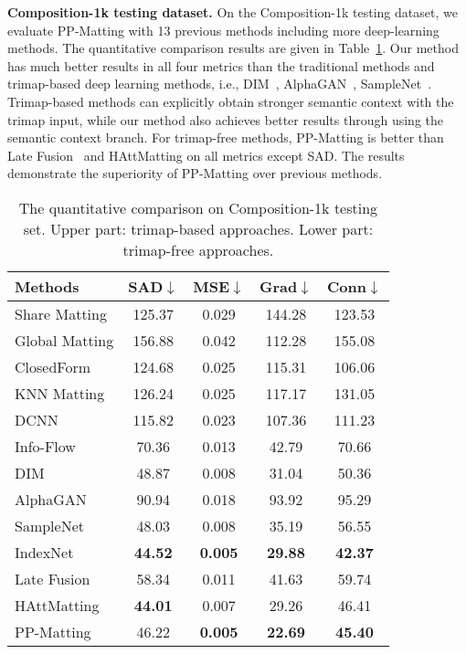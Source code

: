 \documentclass[10pt,twocolumn,letterpaper]{article}
\begin{document}
\textbf{Composition-1k testing dataset.} On the Composition-1k testing dataset, we evaluate PP-Matting with 13 previous methods including more deep-learning methods. The quantitative comparison results are given in Table~\ref{tab:composition}. Our method has much better results in all four metrics than the traditional methods and trimap-based deep learning methods, i.e., DIM~\cite{xu2017deep}, AlphaGAN~\cite{lutz2018alphagan}, SampleNet~\cite{tang2019learning}. Trimap-based methods can explicitly obtain stronger semantic context with the trimap input, while our method also achieves better results through using the semantic context branch. For trimap-free methods, PP-Matting is better than Late Fusion~\cite{zhang2019late} and HAttMatting on all metrics except SAD. The results demonstrate the superiority of PP-Matting over previous methods.

\begin{table}
  \centering
  \begin{tabular}{@{}lcccc@{}}
    \toprule
    Methods & SAD$\downarrow$ & MSE$\downarrow$ & Grad$\downarrow$ & Conn$\downarrow$ \\
    \midrule
    Share Matting \cite{gastal2010shared} & 125.37 & 0.029 & 144.28 & 123.53 \\
    Global Matting\cite{he2011global} & 156.88 & 0.042 & 112.28 & 155.08 \\
    ClosedForm \cite{levin2007closed} & 124.68 & 0.025 & 115.31 & 106.06 \\
    KNN Matting \cite{chen2013knn} & 126.24 & 0.025 & 117.17 & 131.05 \\
    DCNN \cite{shen2016deep} & 115.82 & 0.023 & 107.36 & 111.23 \\
    Info-Flow \cite{aksoy2017designing} & 70.36 & 0.013 & 42.79 & 70.66 \\
    DIM \cite{xu2017deep} & 48.87 & 0.008 & 31.04 & 50.36 \\
    AlphaGAN \cite{lutz2018alphagan} & 90.94 & 0.018 & 93.92& 95.29 \\
    SampleNet \cite{tang2019learning} & 48.03 & 0.008 & 35.19 & 56.55 \\
    IndexNet \cite{lu2019indices} & \bf{44.52} & \bf{0.005} & \bf{29.88} & \bf{42.37} \\
    \midrule
    Late Fusion \cite{zhang2019late} & 58.34 & 0.011 & 41.63 & 59.74 \\
    HAttMatting \cite{qiao2020attention} & \bf{44.01} & 0.007 & 29.26 & 46.41 \\
PP-Matting & 46.22 & \bf{0.005} & \bf{22.69} & \bf{45.40} \\
    \bottomrule
  \end{tabular}
  \caption{The quantitative comparison on Composition-1k testing set. Upper part: trimap-based approaches. Lower part: trimap-free approaches.}
  \label{tab:composition}
\end{table}
\end{document}
